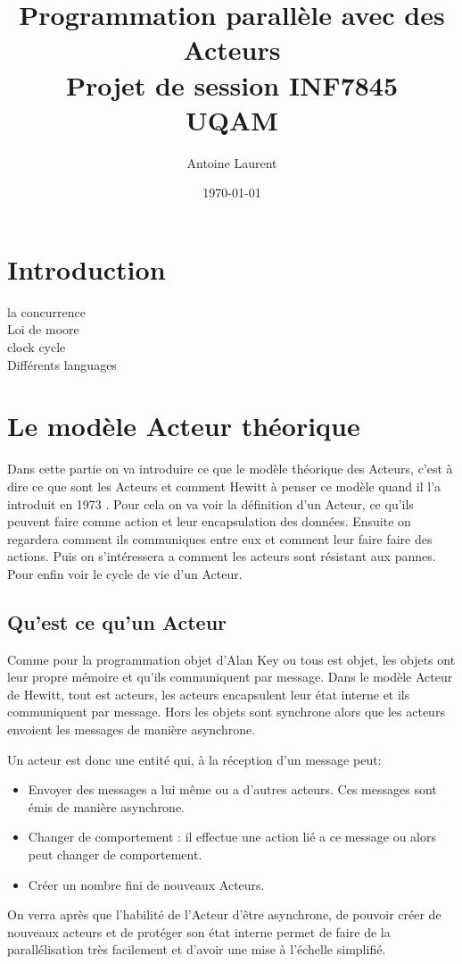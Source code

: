 \documentclass[11pt, a4paper]{article}
\title{Programmation parallèle avec des Acteurs \\ \large{Projet de session INF7845 \\ UQAM}}
\date{\today}
\author{Antoine Laurent}
\begin{document}
\maketitle
\newpage 

\section{Introduction}
la concurrence \\
Loi de moore \\
clock cycle \\
Différents languages \\

\section{Le modèle Acteur théorique}

Dans cette partie on va introduire ce que le modèle théorique des Acteurs, c'est à dire ce que sont les Acteurs et comment Hewitt à penser ce modèle quand il l'a introduit en 1973 \cite{hewitt1973session}. Pour cela on va voir la définition d'un Acteur, ce qu'ils peuvent faire comme action et leur encapsulation des données. Ensuite on regardera comment ils communiques entre eux et comment leur faire faire des actions. Puis on s'intéressera a comment les acteurs sont résistant aux pannes. Pour enfin voir le cycle de vie d'un Acteur.

\subsection{Qu'est ce qu'un Acteur}

Comme pour la programmation objet d'Alan Key ou tous est objet, les objets ont leur propre mémoire et qu'ils communiquent par message. Dans le modèle Acteur de Hewitt, tout est acteurs, les acteurs encapsulent leur état interne et ils communiquent par message. Hors les objets sont synchrone alors que les acteurs envoient les messages de manière asynchrone. 
\par 
Un acteur est donc une entité qui, à la réception d'un message peut: 
\begin{itemize}
\item Envoyer des messages a lui même ou a d'autres acteurs. Ces messages sont émis de manière asynchrone.
\item Changer de comportement : il effectue une action lié a ce message ou alors peut changer de comportement.
\item Créer un nombre fini de nouveaux Acteurs.
\end{itemize}
On verra après que l'habilité de l'Acteur d'être asynchrone, de pouvoir créer de nouveaux acteurs et de protéger son état interne permet de faire de la parallélisation très facilement et d'avoir une mise à l'échelle simplifié.
\end{document}

